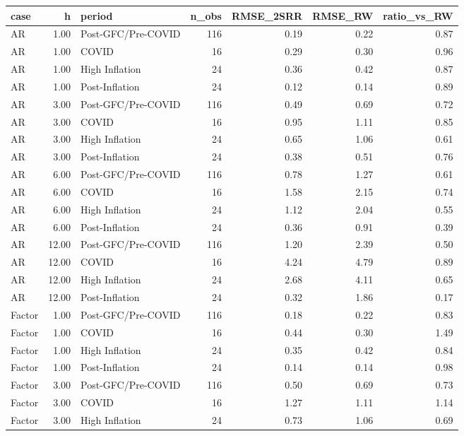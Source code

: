 \begin{table}[ht]
\centering
\begin{tabular}{lrlrrrr}
  \hline
case & h & period & n\_obs & RMSE\_2SRR & RMSE\_RW & ratio\_vs\_RW \\ 
  \hline
AR & 1.00 & Post-GFC/Pre-COVID & 116 & 0.19 & 0.22 & 0.87 \\ 
  AR & 1.00 & COVID &  16 & 0.29 & 0.30 & 0.96 \\ 
  AR & 1.00 & High Inflation &  24 & 0.36 & 0.42 & 0.87 \\ 
  AR & 1.00 & Post-Inflation &  24 & 0.12 & 0.14 & 0.89 \\ 
  AR & 3.00 & Post-GFC/Pre-COVID & 116 & 0.49 & 0.69 & 0.72 \\ 
  AR & 3.00 & COVID &  16 & 0.95 & 1.11 & 0.85 \\ 
  AR & 3.00 & High Inflation &  24 & 0.65 & 1.06 & 0.61 \\ 
  AR & 3.00 & Post-Inflation &  24 & 0.38 & 0.51 & 0.76 \\ 
  AR & 6.00 & Post-GFC/Pre-COVID & 116 & 0.78 & 1.27 & 0.61 \\ 
  AR & 6.00 & COVID &  16 & 1.58 & 2.15 & 0.74 \\ 
  AR & 6.00 & High Inflation &  24 & 1.12 & 2.04 & 0.55 \\ 
  AR & 6.00 & Post-Inflation &  24 & 0.36 & 0.91 & 0.39 \\ 
  AR & 12.00 & Post-GFC/Pre-COVID & 116 & 1.20 & 2.39 & 0.50 \\ 
  AR & 12.00 & COVID &  16 & 4.24 & 4.79 & 0.89 \\ 
  AR & 12.00 & High Inflation &  24 & 2.68 & 4.11 & 0.65 \\ 
  AR & 12.00 & Post-Inflation &  24 & 0.32 & 1.86 & 0.17 \\ 
  Factor & 1.00 & Post-GFC/Pre-COVID & 116 & 0.18 & 0.22 & 0.83 \\ 
  Factor & 1.00 & COVID &  16 & 0.44 & 0.30 & 1.49 \\ 
  Factor & 1.00 & High Inflation &  24 & 0.35 & 0.42 & 0.84 \\ 
  Factor & 1.00 & Post-Inflation &  24 & 0.14 & 0.14 & 0.98 \\ 
  Factor & 3.00 & Post-GFC/Pre-COVID & 116 & 0.50 & 0.69 & 0.73 \\ 
  Factor & 3.00 & COVID &  16 & 1.27 & 1.11 & 1.14 \\ 
  Factor & 3.00 & High Inflation &  24 & 0.73 & 1.06 & 0.69 \\ 

\end{tabular}
\end{table}
